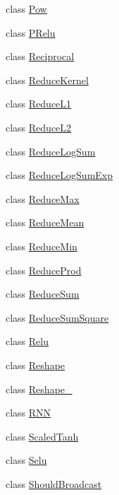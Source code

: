 \begin{DoxyCompactItemize}
\item 
class \mbox{\hyperlink{classonnxruntime_1_1cuda_1_1Pow}{Pow}}
\item 
class \mbox{\hyperlink{classonnxruntime_1_1cuda_1_1PRelu}{P\+Relu}}
\item 
class \mbox{\hyperlink{classonnxruntime_1_1cuda_1_1Reciprocal}{Reciprocal}}
\item 
class \mbox{\hyperlink{classonnxruntime_1_1cuda_1_1ReduceKernel}{Reduce\+Kernel}}
\item 
class \mbox{\hyperlink{classonnxruntime_1_1cuda_1_1ReduceL1}{Reduce\+L1}}
\item 
class \mbox{\hyperlink{classonnxruntime_1_1cuda_1_1ReduceL2}{Reduce\+L2}}
\item 
class \mbox{\hyperlink{classonnxruntime_1_1cuda_1_1ReduceLogSum}{Reduce\+Log\+Sum}}
\item 
class \mbox{\hyperlink{classonnxruntime_1_1cuda_1_1ReduceLogSumExp}{Reduce\+Log\+Sum\+Exp}}
\item 
class \mbox{\hyperlink{classonnxruntime_1_1cuda_1_1ReduceMax}{Reduce\+Max}}
\item 
class \mbox{\hyperlink{classonnxruntime_1_1cuda_1_1ReduceMean}{Reduce\+Mean}}
\item 
class \mbox{\hyperlink{classonnxruntime_1_1cuda_1_1ReduceMin}{Reduce\+Min}}
\item 
class \mbox{\hyperlink{classonnxruntime_1_1cuda_1_1ReduceProd}{Reduce\+Prod}}
\item 
class \mbox{\hyperlink{classonnxruntime_1_1cuda_1_1ReduceSum}{Reduce\+Sum}}
\item 
class \mbox{\hyperlink{classonnxruntime_1_1cuda_1_1ReduceSumSquare}{Reduce\+Sum\+Square}}
\item 
class \mbox{\hyperlink{classonnxruntime_1_1cuda_1_1Relu}{Relu}}
\item 
class \mbox{\hyperlink{classonnxruntime_1_1cuda_1_1Reshape}{Reshape}}
\item 
class \mbox{\hyperlink{classonnxruntime_1_1cuda_1_1Reshape__1}{Reshape\+\_}}
\item 
class \mbox{\hyperlink{classonnxruntime_1_1cuda_1_1RNN}{R\+NN}}
\item 
class \mbox{\hyperlink{classonnxruntime_1_1cuda_1_1ScaledTanh}{Scaled\+Tanh}}
\item 
class \mbox{\hyperlink{classonnxruntime_1_1cuda_1_1Selu}{Selu}}
\item 
class \mbox{\hyperlink{classonnxruntime_1_1cuda_1_1ShouldBroadcast}{Should\+Broadcast}}
\item 

\end{DoxyCompactItemize}
